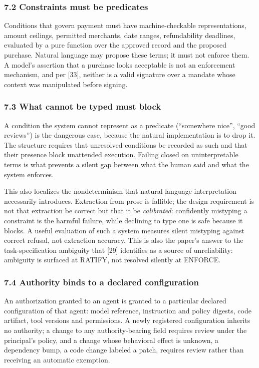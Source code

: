 \documentclass[
  11pt,
  letterpaper,
]{article}
\begin{document}
\subsubsection{7.2 Constraints must be
predicates}\label{constraints-must-be-predicates}

Conditions that govern payment must have machine-checkable
representations, amount ceilings, permitted merchants, date ranges,
refundability deadlines, evaluated by a pure function over the approved
record and the proposed purchase. Natural language may propose these
terms; it must not enforce them. A model's assertion that a purchase
looks acceptable is not an enforcement mechanism, and per {[}33{]},
neither is a valid signature over a mandate whose context was
manipulated before signing.

\subsubsection{7.3 What cannot be typed must
block}\label{what-cannot-be-typed-must-block}

A condition the system cannot represent as a predicate (``somewhere
nice'', ``good reviews'') is the dangerous case, because the natural
implementation is to drop it. The structure requires that unresolved
conditions be recorded as such and that their presence block unattended
execution. Failing closed on uninterpretable terms is what prevents a
silent gap between what the human said and what the system enforces.

This also localizes the nondeterminism that natural-language
interpretation necessarily introduces. Extraction from prose is
fallible; the design requirement is not that extraction be correct but
that it be \emph{calibrated}: confidently mistyping a constraint is the
harmful failure, while declining to type one is safe because it blocks.
A useful evaluation of such a system measures silent mistyping against
correct refusal, not extraction accuracy. This is also the paper's
answer to the task-specification ambiguity that {[}29{]} identifies as a
source of unreliability: ambiguity is surfaced at RATIFY, not resolved
silently at ENFORCE.

\subsubsection{7.4 Authority binds to a declared
configuration}\label{authority-binds-to-a-declared-configuration}

An authorization granted to an agent is granted to a particular declared
configuration of that agent: model reference, instruction and policy
digests, code artifact, tool versions and permissions. A newly
registered configuration inherits no authority; a change to any
authority-bearing field requires review under the principal's policy,
and a change whose behavioral effect is unknown, a dependency bump, a
code change labeled a patch, requires review rather than receiving an
automatic exemption.
\end{document}
